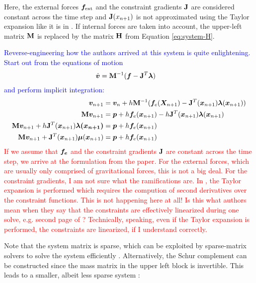 Here, the external forces $\bm{f}_{\text{ext}}$ and the constraint gradients $\mathbf{J}$ are considered constant across the time step 
and $\mathbf{J}(x_{n+1})$ 
is not approximated using the Taylor expansion like it is in \cite{baraff1998}. If internal forces are taken into account, the upper-left 
matrix $\mathbf{M}$ is replaced by the matrix $\mathbf{H}$ from Equation \ref{eq:system-H}.

\textcolor{blue}{Reverse-engineering how the authors arrived at this system is quite enlightening. Start out from the equations of motion 
\cite{ascher1995}
    \begin{align*}
        \dot{\bm{v}} &= \mathbf{M}^{-1}(\bm{f} - \mathbf{J}^T \bm{\lambda})
    \end{align*}
    and perform implicit integration:
    \begin{align*}
        \bm{v}_{n+1} &= \bm{v}_n + h\mathbf{M}^{-1}(\bm{f}_e(\bm{X}_{n+1}) - \mathbf{J}^T(\bm{x}_{n+1}) \bm{\lambda}(\bm{x}_{n+1})) \\
        \mathbf{M}\bm{v}_{n+1} &= \bm{p} + h\bm{f}_e(\bm{x}_{n+1}) - h\mathbf{J}^T(\bm{x}_{n+1})\bm{\lambda}(\bm{x}_{n+1}) \\
        \mathbf{M}\bm{v}_{n+1} + h \mathbf{J}^T(\bm{x}_{n+1})\bm{\lambda(\bm{x}_{n+1})} &= \bm{p} + h\bm{f}_e(\bm{x}_{n+1}) \\
        \mathbf{M}\bm{v}_{n+1} + \mathbf{J}^T(\bm{x}_{n+1}) \bm{\mu}(\bm{x}_{n+1}) &= \bm{p} + h\bm{f}_e(\bm{x}_{n+1})
    \end{align*}
}
\textcolor{red}{If we assume that $\bm{f_e}$ and the constraint gradients $\mathbf{J}$ are constant across the time step, we arrive at the 
formulation from the paper. For the external forces, which are usually only comprised of gravitational forces, this is not a big 
deal. For the constraint gradients, I am not sure what the ramifications are. In \cite{baraff1998}, the Taylor expansion is performed
which requires the compution of second derivatives over the constraint functions. This is not happening here at all! Is this what 
authors mean when they say that the constraints are effectively linearized during one solve, e.g. second page 
of \cite{mueller2020}? Technically, speaking, even if the Taylor expansion is performed, the constraints are linearized, if I 
understand correctly.}

Note that the system matrix is sparse, which can be exploited by sparse-matrix solvers to solve the system efficiently
\cite{baraff1996}. Alternatively, the Schur complement can be constructed since the mass matrix in the upper left block is invertible.
This leads to a smaller, albeit less sparse system \cite{tournier2015}:


